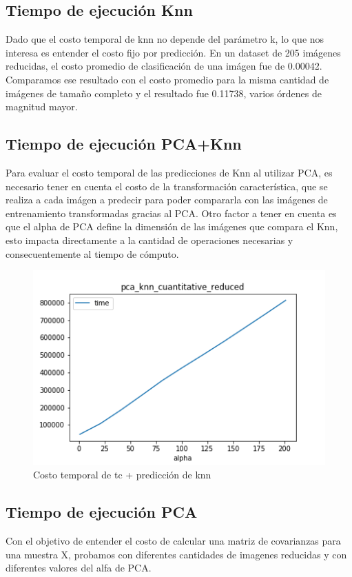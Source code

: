 \subsection{Tiempo de ejecución Knn}

Dado que el costo temporal de knn no depende del parámetro k, lo que nos interesa es entender el costo fijo por predicción. En un dataset de 205 imágenes reducidas, el costo promedio de clasificación de una imágen fue de 0.00042. Comparamos ese resultado con el costo promedio para la misma cantidad de imágenes de tamaño completo y el resultado fue 0.11738, varios órdenes de magnitud mayor. 

\subsection{Tiempo de ejecución PCA+Knn}

Para evaluar el costo temporal de las predicciones de Knn al utilizar PCA, es necesario tener en cuenta el costo de la transformación característica, que se realiza a cada imágen a predecir para poder compararla con las imágenes de entrenamiento transformadas gracias al PCA. Otro factor a tener en cuenta es que el alpha de PCA define la dimensión de las imágenes que compara el Knn, esto impacta directamente a la cantidad de operaciones necesarias y consecuentemente al tiempo de cómputo.

\begin{figure}[H]
	\begin{center}
      \includegraphics[width=0.4\columnwidth]{imagenes/charuli-des/pca_knn_cuantitative_reduced.png}
      \caption{Costo temporal de tc + predicción de knn}
      \end{center}
\end{figure}

\subsection{Tiempo de ejecución PCA}

Con el objetivo de entender el costo de calcular una matriz de covarianzas para una muestra X, probamos con diferentes cantidades de imagenes reducidas y con diferentes valores del alfa de PCA. 

